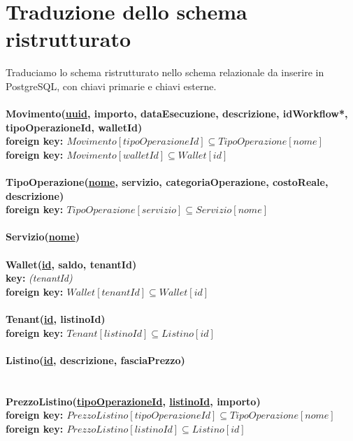 \section{Traduzione dello schema ristrutturato}
Traduciamo lo schema ristrutturato nello schema relazionale da inserire in PostgreSQL, con chiavi primarie e chiavi esterne.
\\\\
\textbf{Movimento(\underline{uuid}, importo, dataEsecuzione, descrizione, idWorkflow*,\\ tipoOperazioneId, walletId) \\}
\textbf{\hspace*{1.5 cm} foreign key: $ Movimento[tipoOperazioneId] \subseteq TipoOperazione[nome] $} \\
\textbf{\hspace*{1.5 cm} foreign key: $ Movimento[walletId] \subseteq Wallet[id] $ }
\\\\
\textbf{TipoOperazione(\underline{nome}, servizio, categoriaOperazione, costoReale, \\descrizione) \\}
\textbf{\hspace*{1.5 cm} foreign key: $ TipoOperazione[servizio] \subseteq Servizio[nome] $}
\\\\
\textbf{Servizio(\underline{nome})}
\\\\
\textbf{Wallet(\underline{id}, saldo, tenantId) \\}
\textbf{\hspace*{1.5 cm} key:} \textit{(tenantId)} \\
\textbf{\hspace*{1.5 cm} foreign key: $ Wallet[tenantId] \subseteq Wallet[id] $}
\\\\
\textbf{Tenant(\underline{id}, listinoId) \\}
\textbf{\hspace*{1.5 cm} foreign key: $ Tenant[listinoId] \subseteq Listino[id] $}
\\\\
\textbf{Listino(\underline{id}, descrizione, fasciaPrezzo) \\}
\\\\
\textbf{PrezzoListino(\underline{tipoOperazioneId}, \underline{listinoId}, importo) \\}
\textbf{\hspace*{1.5 cm} foreign key: $ PrezzoListino[tipoOperazioneId] \subseteq TipoOperazione[nome] $} \\
\textbf{\hspace*{1.5 cm} foreign key: $ PrezzoListino[listinoId] \subseteq Listino[id] $}

